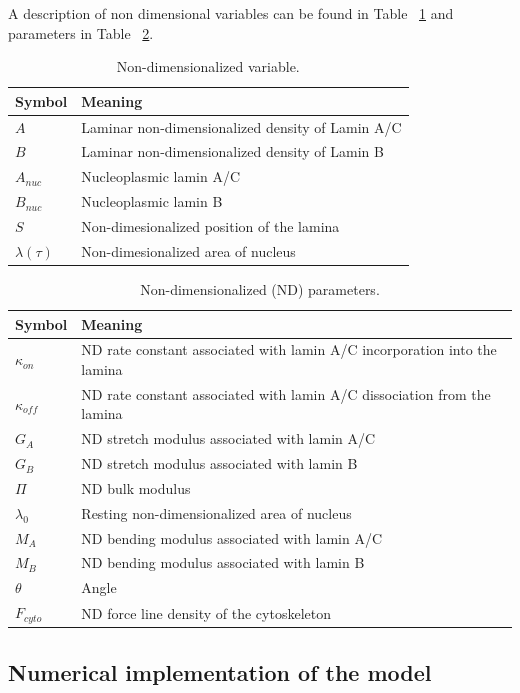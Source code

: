 A description of non dimensional variables can be found in Table ~\ref{tab:nondimvar} and parameters in Table ~\ref{tab:nondimpar}.

\begin{table}[t!]
\caption{Non-dimensionalized variable.}\centering \label{tab:nondimvar} 
\begin{tabular}{ l  l}
\hline
Symbol  & Meaning \\
\hline
$A$ & Laminar non-dimensionalized density of Lamin A/C \\
$B$ & Laminar non-dimensionalized density of Lamin B  \\
$A_{nuc}$ & Nucleoplasmic lamin A/C \\
$B_{nuc}$ & Nucleoplasmic lamin B\\
$S$ & Non-dimesionalized position of the lamina\\
$\lambda(\tau)$ & Non-dimesionalized area of nucleus\\
\hline
\end{tabular}
\end{table}


\begin{table}[t!]
\caption{Non-dimensionalized (ND) parameters.}\centering \label{tab:nondimpar} 
\begin{tabular}{ l  l}
\hline
Symbol  & Meaning \\
\hline
$\kappa_{on}$ &  ND rate constant associated with lamin A/C incorporation into the lamina\\
$\kappa_{off}$ &  ND rate constant associated with lamin A/C dissociation from the lamina\\
$G_A$ & ND stretch modulus associated with lamin A/C \\
$G_B$ &  ND stretch modulus associated with lamin B\\
$\Pi$ &  ND bulk modulus \\
$\lambda_0$ & Resting non-dimensionalized area of nucleus\\
$M_A$ & ND bending modulus associated with lamin A/C\\
$M_B$  & ND bending modulus associated with lamin B\\
$\theta$ & Angle   \\
$F_{cyto}$ & ND force line density of the cytoskeleton \\
\hline
\end{tabular}
\end{table}


\subsection{Numerical implementation of the model}

